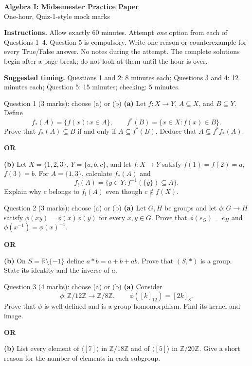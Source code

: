 \documentclass[11pt,a4paper]{article}
\newcommand{\Z}{\mathbb Z}
\newcommand{\R}{\mathbb R}
\newcommand{\angles}[1]{\langle #1\rangle}
\begin{document}
\begin{center}
{\LARGE\bfseries Algebra I: Midsemester Practice Paper}\\[.4em]
{\large One-hour, Quiz-1-style mock}\quad\textbullet{} marks
\end{center}

\noindent\textbf{Instructions.} Allow exactly 60 minutes. Attempt \emph{one} option from each of Questions 1--4. Question 5 is compulsory. Write one reason or counterexample for every True/False answer. No notes during the attempt. The complete solutions begin after a page break; do not look at them until the hour is over.

\noindent\textbf{Suggested timing.} Questions 1 and 2: 8 minutes each; Questions 3 and 4: 12 minutes each; Question 5: 15 minutes; checking: 5 minutes.

\begin{examquestion}{Question 1 (3 marks): choose (a) or (b)}
\textbf{(a)} Let $f:X\to Y$, $A\subseteq X$, and $B\subseteq Y$. Define
\[
f_*(A)=\{f(x):x\in A\},\qquad
f^*(B)=\{x\in X:f(x)\in B\}.
\]
Prove that $f_*(A)\subseteq B$ if and only if $A\subseteq f^*(B)$. Deduce that $A\subseteq f^*f_*(A)$.

\medskip\noindent\textbf{OR}

\medskip\noindent\textbf{(b)} Let $X=\{1,2,3\}$, $Y=\{a,b,c\}$, and let $f:X\to Y$ satisfy $f(1)=f(2)=a$, $f(3)=b$. For $A=\{1,3\}$, calculate $f_*(A)$ and
\[
f_!(A)=\{y\in Y:f^{-1}(\{y\})\subseteq A\}.
\]
Explain why $c$ belongs to $f_!(A)$ even though $c\notin f(X)$.
\end{examquestion}

\begin{examquestion}{Question 2 (3 marks): choose (a) or (b)}
\textbf{(a)} Let $G,H$ be groups and let $\phi:G\to H$ satisfy $\phi(xy)=\phi(x)\phi(y)$ for every $x,y\in G$. Prove that $\phi(e_G)=e_H$ and $\phi(x^{-1})=\phi(x)^{-1}$.

\medskip\noindent\textbf{OR}

\medskip\noindent\textbf{(b)} On $S=\R\setminus\{-1\}$ define $a*b=a+b+ab$. Prove that $(S,*)$ is a group. State its identity and the inverse of $a$.
\end{examquestion}

\begin{examquestion}{Question 3 (4 marks): choose (a) or (b)}
\textbf{(a)} Consider
\[
\phi:\Z/12\Z\longrightarrow\Z/8\Z,
\qquad \phi([k]_{12})=[2k]_8.
\]
Prove that $\phi$ is well-defined and is a group homomorphism. Find its kernel and image.

\medskip\noindent\textbf{OR}

\medskip\noindent\textbf{(b)} List every element of $\angles{[7]}$ in $\Z/18\Z$ and of $\angles{[5]}$ in $\Z/20\Z$. Give a short reason for the number of elements in each subgroup.
\end{examquestion}
\end{document}
